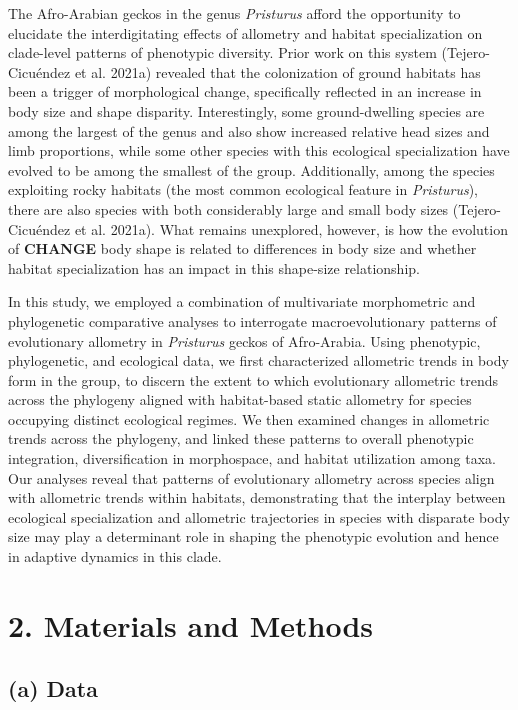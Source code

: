 \documentclass[
  11pt,
]{article}
\begin{document}
The Afro-Arabian geckos in the genus \emph{Pristurus} afford the
opportunity to elucidate the interdigitating effects of allometry and
habitat specialization on clade-level patterns of phenotypic diversity.
Prior work on this system (Tejero-Cicuéndez et al. 2021a) revealed that
the colonization of ground habitats has been a trigger of morphological
change, specifically reflected in an increase in body size and shape
disparity. Interestingly, some ground-dwelling species are among the
largest of the genus and also show increased relative head sizes and
limb proportions, while some other species with this ecological
specialization have evolved to be among the smallest of the group.
Additionally, among the species exploiting rocky habitats (the most
common ecological feature in \emph{Pristurus}), there are also species
with both considerably large and small body sizes (Tejero-Cicuéndez et
al. 2021a). What remains unexplored, however, is how the evolution of
\textbf{CHANGE} body shape is related to differences in body size and
whether habitat specialization has an impact in this shape-size
relationship. \hfill\break

In this study, we employed a combination of multivariate morphometric
and phylogenetic comparative analyses to interrogate macroevolutionary
patterns of evolutionary allometry in \emph{Pristurus} geckos of
Afro-Arabia. Using phenotypic, phylogenetic, and ecological data, we
first characterized allometric trends in body form in the group, to
discern the extent to which evolutionary allometric trends across the
phylogeny aligned with habitat-based static allometry for species
occupying distinct ecological regimes. We then examined changes in
allometric trends across the phylogeny, and linked these patterns to
overall phenotypic integration, diversification in morphospace, and
habitat utilization among taxa. Our analyses reveal that patterns of
evolutionary allometry across species align with allometric trends
within habitats, demonstrating that the interplay between ecological
specialization and allometric trajectories in species with disparate
body size may play a determinant role in shaping the phenotypic
evolution and hence in adaptive dynamics in this clade.

\hypertarget{materials-and-methods}{%
\section{2. Materials and Methods}\label{materials-and-methods}}

\hypertarget{a-data}{%
\subsection{(a) Data}\label{a-data}}
\end{document}
